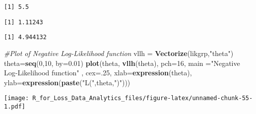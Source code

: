 \documentclass[]{book}
\newenvironment{Shaded}{\begin{snugshade}}{\end{snugshade}}
\newcommand{\KeywordTok}[1]{\textcolor[rgb]{0.13,0.29,0.53}{\textbf{#1}}}
\newcommand{\DataTypeTok}[1]{\textcolor[rgb]{0.13,0.29,0.53}{#1}}
\newcommand{\DecValTok}[1]{\textcolor[rgb]{0.00,0.00,0.81}{#1}}
\newcommand{\FloatTok}[1]{\textcolor[rgb]{0.00,0.00,0.81}{#1}}
\newcommand{\StringTok}[1]{\textcolor[rgb]{0.31,0.60,0.02}{#1}}
\newcommand{\CommentTok}[1]{\textcolor[rgb]{0.56,0.35,0.01}{\textit{#1}}}
\newcommand{\OperatorTok}[1]{\textcolor[rgb]{0.81,0.36,0.00}{\textbf{#1}}}
\newcommand{\NormalTok}[1]{#1}
\theoremstyle{definition}
\theoremstyle{definition}
\theoremstyle{definition}
\theoremstyle{remark}
\begin{document}
\begin{verbatim}
[1] 5.5
\end{verbatim}

\begin{Shaded}
\end{Shaded}

\begin{verbatim}
[1] 1.11243
\end{verbatim}

\begin{Shaded}
\end{Shaded}

\begin{verbatim}
[1] 4.944132
\end{verbatim}

\begin{Shaded}
\begin{Highlighting}[]
\CommentTok{#Plot of Negative Log-Likelihood function }
\NormalTok{vllh =}\StringTok{ }\KeywordTok{Vectorize}\NormalTok{(likgrp,}\StringTok{"theta"}\NormalTok{)}
\NormalTok{theta=}\KeywordTok{seq}\NormalTok{(}\DecValTok{0}\NormalTok{,}\DecValTok{10}\NormalTok{, }\DataTypeTok{by=}\FloatTok{0.01}\NormalTok{)}
\KeywordTok{plot}\NormalTok{(theta, }\KeywordTok{vllh}\NormalTok{(theta), }\DataTypeTok{pch=}\DecValTok{16}\NormalTok{, }\DataTypeTok{main =}\StringTok{"Negative Log-Likelihood function"}\NormalTok{ , }\DataTypeTok{cex=}\NormalTok{.}\DecValTok{25}\NormalTok{, }
     \DataTypeTok{xlab=}\KeywordTok{expression}\NormalTok{(theta), }\DataTypeTok{ylab=}\KeywordTok{expression}\NormalTok{(}\KeywordTok{paste}\NormalTok{(}\StringTok{"L("}\NormalTok{,theta,}\StringTok{")"}\NormalTok{)))}
\end{Highlighting}
\end{Shaded}

\texttt{[image: R\_for\_Loss\_Data\_Analytics\_files/figure-latex/unnamed-chunk-55-1.pdf]}
\end{document}

